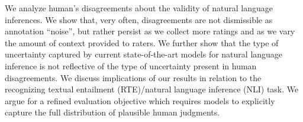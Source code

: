 We analyze human’s disagreements about the validity of natural language inferences. We show that, very often, disagreements are not dismissible as annotation “noise”, but rather persist as we collect more ratings and as we vary the amount of context provided to raters. We further show that the type of uncertainty captured by current state-of-the-art models for natural language inference is not reflective of the type of uncertainty present in human disagreements. We discuss implications of our results in relation to the recognizing textual entailment (RTE)/natural language inference (NLI) task. We argue for a refined evaluation objective which requires models to explicitly capture the full distribution of plausible human judgments.